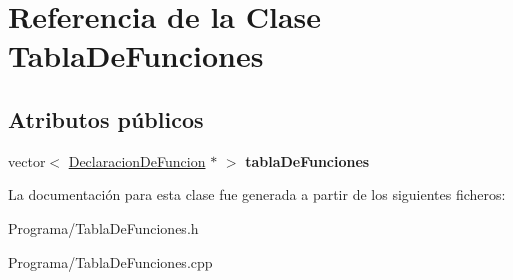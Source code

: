 \hypertarget{class_tabla_de_funciones}{\section{Referencia de la Clase Tabla\-De\-Funciones}
\label{class_tabla_de_funciones}
}
\subsection*{Atributos públicos}
\begin{DoxyCompactItemize}
\item 
\hypertarget{class_tabla_de_funciones_abbccb5a4922a776f433ed89669c0db36}{vector$<$ \hyperlink{class_declaracion_de_funcion}{Declaracion\-De\-Funcion} $\ast$ $>$ {\bfseries tabla\-De\-Funciones}}\label{class_tabla_de_funciones_abbccb5a4922a776f433ed89669c0db36}

\end{DoxyCompactItemize}


La documentación para esta clase fue generada a partir de los siguientes ficheros\-:\begin{DoxyCompactItemize}
\item 
Programa/Tabla\-De\-Funciones.\-h\item 
Programa/Tabla\-De\-Funciones.\-cpp\end{DoxyCompactItemize}
